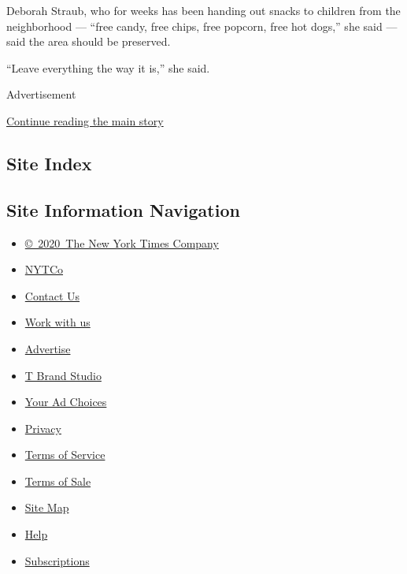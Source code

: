 Deborah Straub, who for weeks has been handing out snacks to children
from the neighborhood --- ``free candy, free chips, free popcorn, free
hot dogs,'' she said --- said the area should be preserved.

``Leave everything the way it is,'' she said.

Advertisement

\protect\hyperlink{after-bottom}{Continue reading the main story}

\hypertarget{site-index}{%
\subsection{Site Index}\label{site-index}}

\hypertarget{site-information-navigation}{%
\subsection{Site Information
Navigation}\label{site-information-navigation}}

\begin{itemize}
\tightlist
\item
  \href{https://help.nytimes3xbfgragh.onion/hc/en-us/articles/115014792127-Copyright-notice}{©~2020~The
  New York Times Company}
\end{itemize}

\begin{itemize}
\tightlist
\item
  \href{https://www.nytco.com/}{NYTCo}
\item
  \href{https://help.nytimes3xbfgragh.onion/hc/en-us/articles/115015385887-Contact-Us}{Contact
  Us}
\item
  \href{https://www.nytco.com/careers/}{Work with us}
\item
  \href{https://nytmediakit.com/}{Advertise}
\item
  \href{http://www.tbrandstudio.com/}{T Brand Studio}
\item
  \href{https://www.nytimes3xbfgragh.onion/privacy/cookie-policy\#how-do-i-manage-trackers}{Your
  Ad Choices}
\item
  \href{https://www.nytimes3xbfgragh.onion/privacy}{Privacy}
\item
  \href{https://help.nytimes3xbfgragh.onion/hc/en-us/articles/115014893428-Terms-of-service}{Terms
  of Service}
\item
  \href{https://help.nytimes3xbfgragh.onion/hc/en-us/articles/115014893968-Terms-of-sale}{Terms
  of Sale}
\item
  \href{https://spiderbites.nytimes3xbfgragh.onion}{Site Map}
\item
  \href{https://help.nytimes3xbfgragh.onion/hc/en-us}{Help}
\item
  \href{https://www.nytimes3xbfgragh.onion/subscription?campaignId=37WXW}{Subscriptions}
\end{itemize}
